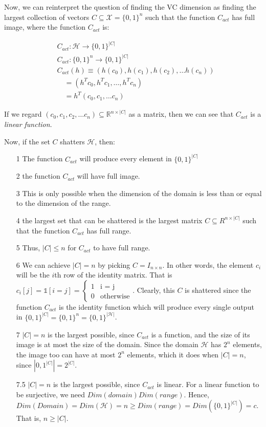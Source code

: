 \documentclass[11pt]{article}
\renewcommand{\H}{\ensuremath{\mathcal{H}}}
\newcommand{\X}{\ensuremath{\mathcal{X}}}
\begin{document}
Now, we can reinterpret the question of finding the VC dimension as finding
the largest collection of vectors $C \subseteq \X = \{0, 1\}^n$ such that
the function $C_{act}$ has full image, where the function $C_{act}$ is:

\begin{align*}
&C_{act}: \H \rightarrow \{0, 1\}^{|C|} \\
&C_{act}: \{0, 1\}^n \rightarrow \{0, 1\}^|C| \\
&C_{act}(h) \equiv (h(c_0), h(c_1), h(c_2), \dots h(c_n)) \\
&\quad = (h^T c_0, h^T c_1, \dots, h^T c_n) \\
& \quad = h^T (c_0, c_1, \dots c_n)
\end{align*}

If we regard $(c_0, c_1, c_2, \dots c_n) \subseteq \mathbb R^{n \times |C|}$
as a matrix, then we can see that  $C_{act}$ is a \emph{linear function}.


Now, if the set $C$ shatters $\H$, then:
\begin{itemize}
\item[1] The function $C_{act}$ will produce every element in $\{0, 1\}^{|C|}$
\item[2] the function $C_{act}$ will have full image. 
\item[3] This is  only possible when the dimension of the domain is less than or equal to the dimension of the range.
\item[4] the largest set that can be shattered is the largest matrix  $C \subseteq R^{n \times |C|}$  
         such that the function $C_{act}$ has full range.
\item[5] Thus, $|C| \leq n$ for $C_{act}$ to have full range.
\item[6] We can achieve $|C| = n$ by picking $C = I_{n \times n}$. In other words,
          the element $c_i$ will be the $i$th row of the identity matrix. That
          is $c_i[j] = \mathbb{1}[i = j] = \begin{cases} 1 & \text{i = j} \\ 0 & \text{otherwise} \end{cases}$.
         Clearly, this $C$ is shattered since the function $C_{act}$ is the identity function which
         will produce every single output in $\{0, 1\}^{|C|} = \{0, 1\}^n = \{0, 1\}^{|\H|}$.         
\item[7] $|C|=n$ is the largest possible, since $C_{act}$ is a function, and
         the size of its image is at most the size of the domain. Since the domain $\H$
         has $2^n$ elements, the image too can have at most $2^n$ elements, which
         it does when $|C| = n$, since $|{0, 1}^{|C|}| = 2^{|C|}$.
\item[7.5] $|C|=n$ is the largest possible, since $C_{act}$ is linear.
            For a linear function to be surjective, we need $Dim(domain)  Dim(range)$.
            Hence, $Dim(Domain) = Dim(\H) = n \geq Dim(range) = Dim(\{0, 1\}^{|C|}) = c$.
            That is, $n \geq |C|$.
\end{itemize}
\end{document}

